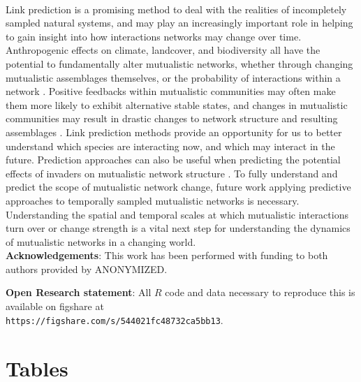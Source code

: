 \paragraph*{}
Link prediction is a promising method to deal with the realities of incompletely sampled natural systems, and may play an increasingly important role in helping to gain insight into how interactions networks may change over time. Anthropogenic effects on climate, landcover, and biodiversity all have the potential to fundamentally alter mutualistic networks, whether through changing mutualistic assemblages themselves, or the probability of interactions within a network \cite{tylianakis2017ecological, memmott2007global, teixido2022anthropogenic}. Positive feedbacks within mutualistic communities may often make them more likely to exhibit alternative stable states, and changes in mutualistic communities may result in drastic changes to network structure and resulting assemblages \cite{lever2014sudden, bascompte2022resilience}. Link prediction methods provide an opportunity for us to better understand which species are interacting now, and which may interact in the future. Prediction approaches can also be useful when predicting the potential effects of invaders on mutualistic network structure \cite{fricke2020accelerating,traveset2014mutualistic}. To fully understand and predict the scope of mutualistic network change, future work applying predictive approaches to temporally sampled mutualistic networks is necessary. Understanding the spatial and temporal scales at which mutualistic interactions turn over or change strength is a vital next step for understanding the dynamics of mutualistic networks in a changing world.\\

\noindent \textbf{Acknowledgements}: This work has been performed with funding to both authors provided by ANONYMIZED. 

\noindent \textbf{Open Research statement}: All $R$ code and data necessary to reproduce this is available on figshare at \\ \texttt{https://figshare.com/s/544021fc48732ca5bb13}.


\clearpage
%
%

\clearpage 

\section*{Tables} 


